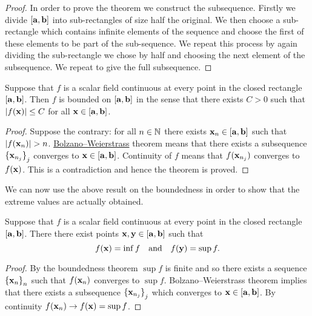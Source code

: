 \begin{proof}
    In order to prove the theorem we construct the subsequence.
    Firstly we divide \( [\mathbf{a},\mathbf{b}]\) into sub-rectangles of size half the original.
    We then choose a sub-rectangle which contains infinite elements of the sequence and choose the first of these elements to be part of the sub-sequence.
    We repeat this process by again dividing the sub-rectangle we chose by half and choosing the next element of the subsequence.
    We repeat to give the full subsequence.
\end{proof}

\begin{theorem}
    Suppose that \(f\) is a scalar field continuous at every point in the closed rectangle \([\mathbf{a},\mathbf{b}]\).
    Then \(f\) is bounded on \([\mathbf{a},\mathbf{b}]\) in the sense that there exists \(C>0\) such that \(\left|f(\mathbf{x})\right| \leq C\) for all \(\mathbf{x} \in [\mathbf{a},\mathbf{b}]\).
\end{theorem}

\begin{proof}
    Suppose the contrary: for all \(n\in\mathbb{N}\) there exists \(\mathbf{x}_n\in [\mathbf{a},\mathbf{b}]\) such that \(\abs{f(\xx_n)}>n\).
    \href{https://en.wikipedia.org/wiki/Bolzano%E2%80%93Weierstrass_theorem}{Bolzano–Weierstrass} theorem means that there exists a subsequence \({\{\mathbf{x}_{n_j}\}}_{j}\) converges to \( \mathbf{x} \in [\mathbf{a},\mathbf{b}]\).
    Continuity of \(f\) means that \(f(\mathbf{x}_{n_j})\) converges to \(f(\mathbf{x})\). This is a contradiction and hence the theorem is proved.
\end{proof}


We can now use the above result on the boundedness in order to show that the  extreme values are actually obtained.

\begin{theorem}
    Suppose that \(f\) is a scalar field continuous at every point in the closed rectangle \([\mathbf{a},\mathbf{b}]\).
    There there exist points \( \mathbf{x}, \mathbf{y} \in [\mathbf{a},\mathbf{b}]\) such that
    \[
        f(\mathbf{x}) = \inf f
        \quad \text{and} \quad
        f(\mathbf{y})= \sup f.
    \]
\end{theorem}

\begin{proof}
    By the boundedness theorem \(\sup f\) is finite and so there exists a sequence  \({\{\mathbf{x}_{n}\}}_{n}\)  such that \(f(\mathbf{x}_n)\) converges to \(\sup f\).
    Bolzano–Weierstrass theorem implies that there exists a subsequence  \({\{\mathbf{x}_{n_j}\}}_{j}\) which converges to \( \mathbf{x} \in [\mathbf{a},\mathbf{b}]\).
    By continuity \(f(\mathbf{x}_n) \to f(\mathbf{x}) = \sup f\).
\end{proof}




